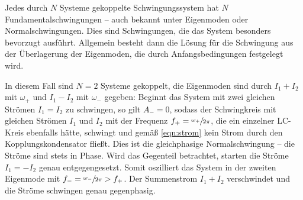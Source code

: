 Jedes durch $N$ Systeme gekoppelte Schwingungssystem hat $N$ Fundamentalschwingungen -- auch bekannt unter Eigenmoden oder 
Normalschwingungen. 
Dies sind Schwingungen, die das System besonders \glqq bevorzugt\grqq{} ausführt. %
Allgemein besteht dann die Lösung für die Schwingung aus der Überlagerung der Eigenmoden, die durch Anfangsbedingungen 
festgelegt wird. 

In diesem Fall sind ${N=2}$ Systeme gekoppelt, die Eigenmoden sind durch ${I_1 + I_2}$ mit ${\omega _+}$ und ${I_1 - I_2}$ 
mit $\omega _-$ gegeben: 
Beginnt das System mit zwei gleichen Strömen ${I_1=I_2}$ zu schwingen, so gilt ${A_- = 0}$, sodass der Schwingkreis mit gleichen Strömen 
$I_1$ und $I_2$ mit der Frequenz ${f_+= \sfrac{\omega _+}{2\pi}}$, die ein einzelner LC-Kreis ebenfalls hätte, schwingt und gemäß 
\eqref{eqn:strom} kein Strom durch den Kopplungskondensator fließt. 
Dies ist die gleichphasige Normalschwingung -- die Ströme sind stets in Phase.
Wird das Gegenteil betrachtet, starten die Ströme $I_1=-I_2$ genau entgegengesetzt. Somit oszilliert 
das System in der zweiten Eigenmode mit ${f_-=\sfrac{\omega _-}{2\pi} > f_+}$. 
Der Summenstrom $I_1 + I_2$ verschwindet und die Ströme schwingen genau gegenphasig. 

